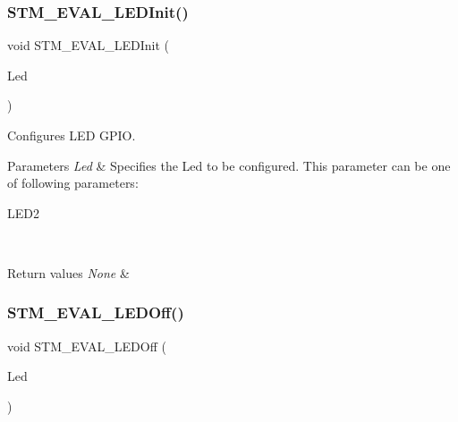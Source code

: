\subsubsection{\texorpdfstring{STM\_EVAL\_LEDInit()}{STM\_EVAL\_LEDInit()}}
{\footnotesize\ttfamily void S\+T\+M\+\_\+\+E\+V\+A\+L\+\_\+\+L\+E\+D\+Init (\begin{DoxyParamCaption}\item[{\mbox{\hyperlink{group___s_t_m32_f1_x_x___n_u_c_l_e_o___l_o_w___l_e_v_e_l___exported___types_gaa059704b7ca945eb9c1e7f2c3d03fecd}{Led\+\_\+\+Type\+Def}}}]{Led }\end{DoxyParamCaption})}



Configures L\+ED G\+P\+IO. 


\begin{DoxyParams}{Parameters}
{\em Led} & Specifies the Led to be configured. This parameter can be one of following parameters\+: \begin{DoxyItemize}
\item L\+E\+D2 \end{DoxyItemize}
\\
\hline
\end{DoxyParams}

\begin{DoxyRetVals}{Return values}
{\em None} & \\
\hline
\end{DoxyRetVals}
\mbox{\label{group___s_t_m32_f1_x_x___n_u_c_l_e_o___l_o_w___l_e_v_e_l___private___functions_gab9ab7deafd606e72d72580ec974b7757}} 
\subsubsection{\texorpdfstring{STM\_EVAL\_LEDOff()}{STM\_EVAL\_LEDOff()}}
{\footnotesize\ttfamily void S\+T\+M\+\_\+\+E\+V\+A\+L\+\_\+\+L\+E\+D\+Off (\begin{DoxyParamCaption}\item[{\mbox{\hyperlink{group___s_t_m32_f1_x_x___n_u_c_l_e_o___l_o_w___l_e_v_e_l___exported___types_gaa059704b7ca945eb9c1e7f2c3d03fecd}{Led\+\_\+\+Type\+Def}}}]{Led }\end{DoxyParamCaption})}



